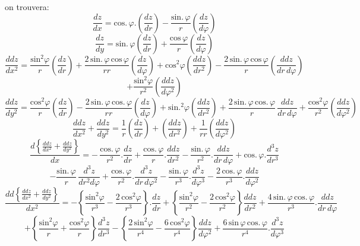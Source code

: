 \documentclass[11pt,a4paper]{article}
\begin{document}
on trouvera:
\[ \frac{dz}{dx} = \text{cos.}\,\varphi.\left(\frac{dz}{dr}\right) - \frac{\text{sin.}\,\varphi}{r}\left(\frac{dz}{d\varphi}\right) \]
\[ \frac{dz}{dy} = \text{sin.}\,\varphi\left(\frac{dz}{dr}\right) + \frac{\text{cos}\,\varphi}{r}\left(\frac{dz}{d\varphi}\right) \]
\[ \frac{ddz}{dx^{2}} = \frac{\text{sin}^{2}\varphi}{r}\left(\frac{dz}{dr}\right) + \frac{2\,\text{sin.}\,\varphi\,\text{cos}\,\varphi}{rr}\left(\frac{dz}{d\varphi}\right) + \text{cos}^{2}\varphi\left(\frac{ddz}{dr^{2}}\right) - \frac{2\,\text{sin.}\,\varphi\,\text{cos}\,\varphi}{r}\left(\frac{ddz}{dr\,d\varphi}\right) \]
\[ + \frac{\text{sin}^{2}\varphi}{r^{2}}\left(\frac{ddz}{d\varphi^{2}}\right) \]
\[ \frac{ddz}{dy^{2}} = \frac{\text{cos}^{2}\varphi}{r}\left(\frac{dz}{dr}\right) - \frac{2\,\text{sin.}\,\varphi\,\text{cos.}\,\varphi}{rr}\left(\frac{dz}{d\varphi}\right) + \text{sin.}^{2}\varphi\left(\frac{ddz}{dr^{2}}\right) + \frac{2\,\text{sin.}\,\varphi\,\text{cos.}\,\varphi}{r}\,\frac{ddz}{dr\,d\varphi} + \frac{\text{cos}^{2}\varphi}{r^{2}}\left(\frac{ddz}{d\varphi^{2}}\right) \]
\[ \frac{ddz}{dx^{2}} + \frac{ddz}{dy^{2}} = \frac{1}{r}\left(\frac{dz}{dr}\right) + \left(\frac{ddz}{dr^{2}}\right) + \frac{1}{rr}\left(\frac{ddz}{d\varphi^{2}}\right) \]
\[ \frac{d\left\{\frac{ddz}{dx^{2}} + \frac{ddz}{dy^{2}}\right\}}{dx} = -\,\frac{\text{cos.}\,\varphi}{r^{2}}.\frac{dz}{dr} + \frac{\text{cos.}\,\varphi}{r}.\frac{ddz}{dr^{2}} - \frac{\text{sin.}\,\varphi}{r^{2}}.\frac{ddz}{dr\,d\varphi} + \text{cos.}\,\varphi.\frac{d^{3}z}{dr^{3}} \]
\[ - \frac{\text{sin.}\,\varphi}{r}\,\frac{d^{3}z}{dr^{2}d\varphi} + \frac{\text{cos.}\,\varphi}{r^{2}}.\frac{d^{3}z}{dr\,d\varphi^{2}} - \frac{\text{sin.}\,\varphi}{r^{3}}.\frac{d^{3}z}{d\varphi^{3}} - \frac{2\,\text{cos.}\,\varphi}{r^{3}}.\frac{ddz}{d\varphi^{2}} \]
\[ \frac{dd\left\{\frac{ddz}{dx^{2}} + \frac{ddz}{dy^{2}}\right\}}{dx^{2}} = -\left\{\frac{\text{sin}^{2}\varphi}{r^{3}} - \frac{2\,\text{cos}^{2}\varphi}{r^{3}}\right\}.\frac{dz}{dr} + \left\{\frac{\text{sin}^{2}\varphi}{r^{2}} - \frac{2\,\text{cos}^{2}\varphi}{r^{2}}\right\}\frac{ddz}{dr^{2}} + \frac{4\,\text{sin.}\,\varphi\,\text{cos.}\,\varphi}{r^{3}}.\frac{ddz}{dr\,d\varphi} \]
\[ + \left\{\frac{\text{sin}^{2}\varphi}{r} + \frac{\text{cos}^{2}\varphi}{r}\right\}\frac{d^{3}z}{dr^{3}} - \left\{\frac{2\,\text{sin}^{2}\varphi}{r^{4}} - \frac{6\,\text{cos}^{2}\varphi}{r^{4}}\right\}\frac{ddz}{d\varphi^{2}} + \frac{6\,\text{sin}\,\varphi\,\text{cos.}\,\varphi}{r^{4}}.\frac{d^{3}z}{d\varphi^{3}} \]
\end{document}
